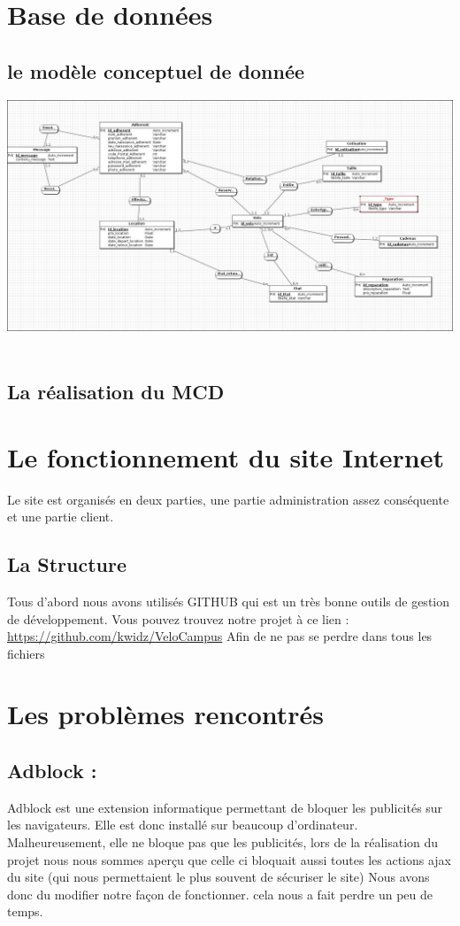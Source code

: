 \documentclass[11pt,a4paper,titlepage]{report}
\begin{document}
\chapter{Base de données}
\section{le modèle conceptuel de donnée}
\begin{center}
\includegraphics[width=1\textwidth]{MCD.jpg}~
\end{center}

\section{La réalisation du MCD}

\chapter{Le fonctionnement du site Internet}
Le site est organisés en deux parties, une partie administration assez conséquente et une partie client.
\section{La Structure}
Tous d'abord nous avons utilisés GITHUB qui est un très bonne outils de gestion de développement.
Vous pouvez trouvez notre projet à ce lien :
\url{https://github.com/kwidz/VeloCampus}
Afin de ne pas se perdre dans tous les fichiers 

\chapter{Les problèmes rencontrés}

\section{Adblock :} 
Adblock est une extension informatique permettant de bloquer les publicités sur les navigateurs. Elle est donc installé sur beaucoup d'ordinateur. 
Malheureusement, elle ne bloque pas que les publicités, lors de la réalisation du projet nous nous sommes aperçu que celle ci bloquait aussi toutes les actions ajax du site (qui nous permettaient le plus souvent de sécuriser le site) 
Nous avons donc du modifier notre façon de fonctionner. cela nous a fait perdre un peu de temps.
\end{document}
